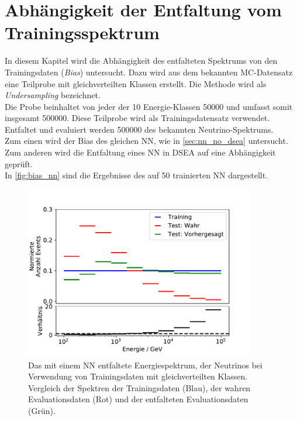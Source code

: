 \section{Abhängigkeit der Entfaltung vom Trainingsspektrum} \label{sec:bias}
In diesem Kapitel wird die Abhängigkeit des entfalteten Spektrums von den Trainingsdaten (\textit{Bias}) untersucht.
Dazu wird aus dem bekannten MC-Datensatz eine Teilprobe mit gleichverteilten Klassen erstellt.
Die Methode wird als \textit{Undersampling} bezeichnet.
\\
Die Probe beinhaltet von jeder der 10 Energie-Klassen \SI{50000}{} und umfasst somit insgesamt \SI{500000}{}.
Diese Teilprobe wird als Trainingsdatensatz verwendet.
Entfaltet und evaluiert werden \SI{500000}{} des bekannten Neutrino-Spektrums.
\\
Zum einen wird der Bias des gleichen NN, wie in \autoref{sec:nn_no_dsea} untersucht.
Zum anderen wird die Entfaltung eines NN in DSEA auf eine Abhängigkeit geprüft.
\\
In \autoref{fig:bias_nn} sind die Ergebnisse des auf \SI{50}{} trainierten NN dargestellt.
\begin{figure}
    \centering
    \includegraphics[width=0.9\textwidth]{Plots/BIAS/NN/spectrum.pdf}
    \caption[Überprüfung des Bias: Spektrum des NN ohne DSEA]{Das mit einem NN entfaltete Energiespektrum, der Neutrinos bei Verwendung von Trainingsdaten mit gleichverteilten Klassen.
    Vergleich der Spektren der Trainingsdaten (Blau), der wahren Evaluationsdaten (Rot) und der entfalteten Evaluationsdaten (Grün).
    }
    \label{fig:bias_nn}
\end{figure}
